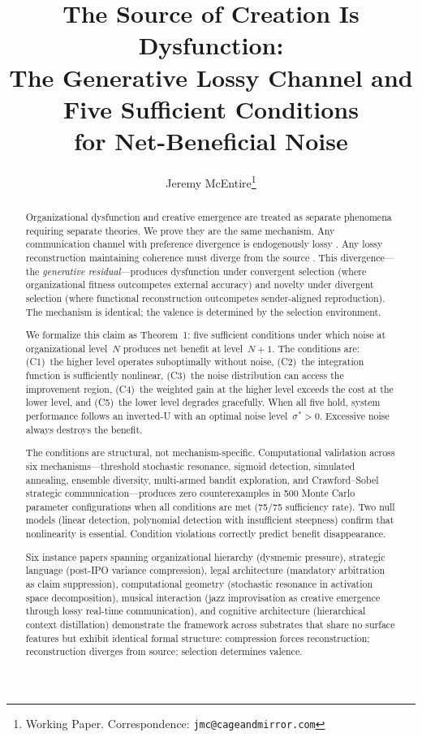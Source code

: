\documentclass[12pt,letterpaper]{article}
\title{\textbf{The Source of Creation Is Dysfunction:}\\[6pt]
\large The Generative Lossy Channel and Five Sufficient Conditions\\for Net-Beneficial Noise}
\author{Jeremy McEntire\thanks{Working Paper. Correspondence: \texttt{jmc@cageandmirror.com}}}
\date{}
\theoremstyle{definition}
\theoremstyle{remark}
\begin{document}
\maketitle
\thispagestyle{empty}

\begin{abstract}
Organizational dysfunction and creative emergence are treated as separate phenomena requiring separate theories. We prove they are the same mechanism. Any communication channel with preference divergence is endogenously lossy \citep{crawford1982}. Any lossy reconstruction maintaining coherence must diverge from the source \citep{blau2018,blau2019}. This divergence---the \emph{generative residual}---produces dysfunction under convergent selection (where organizational fitness outcompetes external accuracy) and novelty under divergent selection (where functional reconstruction outcompetes sender-aligned reproduction). The mechanism is identical; the valence is determined by the selection environment.

We formalize this claim as Theorem~1: five sufficient conditions under which noise at organizational level~$N$ produces net benefit at level~$N{+}1$. The conditions are: (C1)~the higher level operates suboptimally without noise, (C2)~the integration function is sufficiently nonlinear, (C3)~the noise distribution can access the improvement region, (C4)~the weighted gain at the higher level exceeds the cost at the lower level, and (C5)~the lower level degrades gracefully. When all five hold, system performance follows an inverted-U with an optimal noise level~$\sigma^* > 0$. Excessive noise always destroys the benefit.

The conditions are structural, not mechanism-specific. Computational validation across six mechanisms---threshold stochastic resonance, sigmoid detection, simulated annealing, ensemble diversity, multi-armed bandit exploration, and Crawford--Sobel strategic communication---produces zero counterexamples in 500 Monte Carlo parameter configurations when all conditions are met (75/75 sufficiency rate). Two null models (linear detection, polynomial detection with insufficient steepness) confirm that nonlinearity is essential. Condition violations correctly predict benefit disappearance.

Six instance papers spanning organizational hierarchy (dysmemic pressure), strategic language (post-IPO variance compression), legal architecture (mandatory arbitration as claim suppression), computational geometry (stochastic resonance in activation space decomposition), musical interaction (jazz improvisation as creative emergence through lossy real-time communication), and cognitive architecture (hierarchical context distillation) demonstrate the framework across substrates that share no surface features but exhibit identical formal structure: compression forces reconstruction; reconstruction diverges from source; selection determines valence.


\end{abstract}
\end{document}
